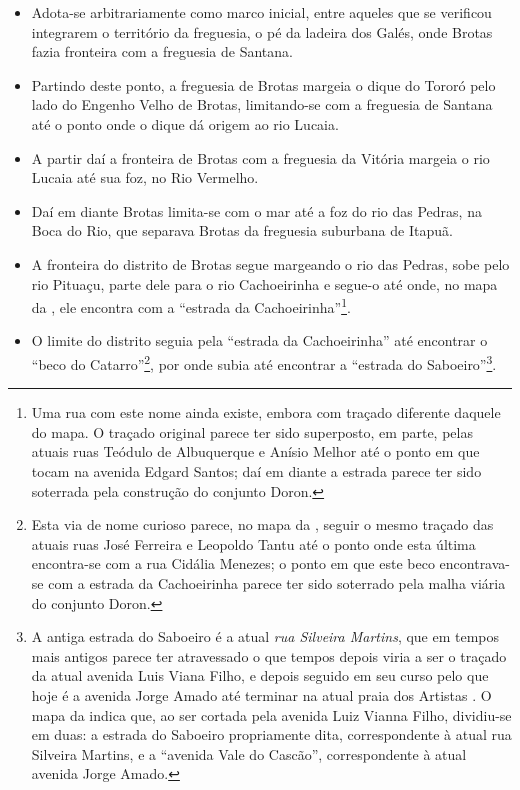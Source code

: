 \begin{itemize}
\item Adota-se arbitrariamente como marco inicial, entre aqueles que se verificou integrarem o território da freguesia, o pé da ladeira dos Galés, onde Brotas fazia fronteira com a freguesia de Santana.
\item Partindo deste ponto, a freguesia de Brotas margeia o dique do Tororó pelo lado do Engenho Velho de Brotas, limitando-se com a freguesia de Santana até o ponto onde o dique dá origem ao rio Lucaia.
\item A partir daí a fronteira de Brotas com a freguesia da Vitória margeia o rio Lucaia até sua foz, no Rio Vermelho.
\item Daí em diante Brotas limita-se com o mar até a foz do rio das Pedras, na Boca do Rio, que separava Brotas da freguesia suburbana de Itapuã.
\item A fronteira do distrito de Brotas segue margeando o rio das Pedras, sobe pelo rio Pituaçu, parte dele para o rio Cachoeirinha e segue-o até onde, no mapa da , ele encontra com a ``estrada da Cachoeirinha''\footnote{Uma rua com este nome ainda existe, embora com traçado diferente daquele do mapa. O traçado original parece ter sido superposto, em parte, pelas atuais ruas Teódulo de Albuquerque e Anísio Melhor até o ponto em que tocam na avenida Edgard Santos; daí em diante a estrada parece ter sido soterrada pela construção do conjunto Doron.}.
\item O limite do distrito seguia pela ``estrada da Cachoeirinha'' até encontrar o ``beco do Catarro''\footnote{Esta via de nome curioso parece, no mapa da , seguir o mesmo traçado das atuais ruas José Ferreira e Leopoldo Tantu até o ponto onde esta última encontra-se com a rua Cidália Menezes; o ponto em que este beco encontrava-se com a estrada da Cachoeirinha parece ter sido soterrado pela malha viária do conjunto Doron.}, por onde subia até encontrar a ``estrada do Saboeiro''\footnote{A antiga estrada do Saboeiro é a atual \textit{rua Silveira Martins}, que em tempos mais antigos parece ter atravessado o que tempos depois viria a ser o traçado da atual avenida Luis Viana Filho, e depois seguido em seu curso pelo que hoje é a avenida Jorge Amado até terminar na atual praia dos Artistas \cite{souza_guia_1935}. O mapa da  indica que, ao ser cortada pela avenida Luiz Vianna Filho, dividiu-se em duas: a estrada do Saboeiro propriamente dita, correspondente à atual rua Silveira Martins, e a ``avenida Vale do Cascão'', correspondente à atual avenida Jorge Amado.}.

\end{itemize}
